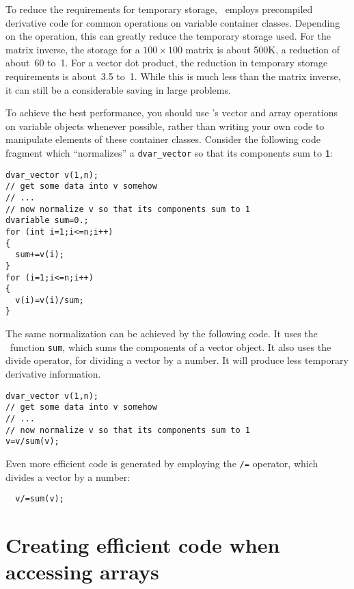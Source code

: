 \documentclass{admbmanual}
\begin{document}
To reduce the requirements for temporary storage, \scAD\ employs
precompiled derivative code for common operations on variable
container classes. Depending on the operation, this can greatly
reduce the temporary storage used. For the matrix inverse, the
storage for a $100\times 100$ matrix is about 500K, a reduction
of about~60 to~1. For a vector dot product, the reduction in
temporary storage requirements is about~3.5 to~1. While
this is much less than the matrix inverse, it can still be a considerable
saving in large problems.

To achieve the best performance, you should
use \scAD's vector and array operations on variable objects whenever
possible, rather than writing your own code to manipulate elements of
these container classes. 
Consider the following code fragment which ``normalizes'' a
\texttt{dvar\_vector} so that its components sum to \texttt{1}:
\begin{lstlisting}
dvar_vector v(1,n);
// get some data into v somehow
// ...
// now normalize v so that its components sum to 1
dvariable sum=0.;
for (int i=1;i<=n;i++)
{
  sum+=v(i);
}
for (i=1;i<=n;i++)
{
  v(i)=v(i)/sum;
}
\end{lstlisting}

The same normalization can be achieved by 
the following code.  It uses the \scAD\ function \texttt{sum}, which
sums the components of a vector object.  It also uses the divide operator,  
for dividing a vector by a number. It will produce less temporary
derivative information.
\begin{lstlisting}
dvar_vector v(1,n);
// get some data into v somehow
// ...
// now normalize v so that its components sum to 1
v=v/sum(v);
\end{lstlisting}

Even more efficient code is generated by employing the \texttt{/=} 
operator, which divides a vector by a number:
\begin{lstlisting}
  v/=sum(v);
\end{lstlisting}




\section{Creating efficient code when accessing arrays}
\end{document}
